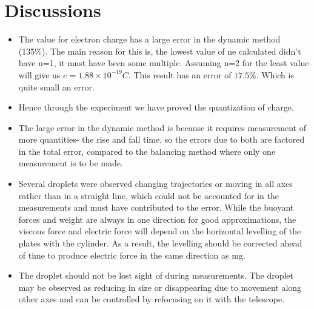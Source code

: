 \section{Discussions}

	\begin{itemize}
		\item The value for electron charge has a large error in the dynamic method (135\%). The main reason for this is, the lowest value of ne calculated didn't have n=1, it must have been some multiple. Assuming n=2 for the least value will give us $e = 1.88\times10^{-19}C$. This result has an error of $17.5\%$. Which is quite small an error.
		\item Hence through the experiment we have proved the quantization of charge.
		\item The large error in the dynamic method is because it requires measurement of more quantities- the rise and fall time, so the errors due to both are factored in the total error, compared to the balancing method where only one measurement is to be made.
		\item Several droplets were observed changing trajectories or moving in all axes rather than in a straight line, which could not be accounted for in the measurements and must have contributed to the error. While the buoyant forces and weight are always in one direction for good approximations, the viscous force and electric force will depend on the horizontal levelling of the plates with the cylinder. As a result, the levelling should be corrected ahead of time to produce electric force in the same direction as mg.
		\item The droplet should not be lost sight of during measurements. The droplet may be observed as reducing in size or disappearing due to movement along other axes and can be controlled by refocusing on it with the telescope.
		
	\end{itemize}
